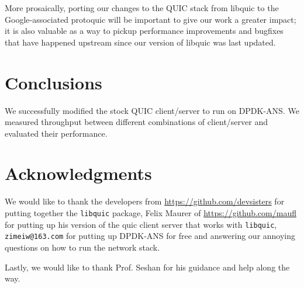 \documentclass{sig-alternate-05-2015}
\begin{document}
More prosaically, porting our changes to the QUIC stack from libquic
to the Google-associated protoquic
will be important to give our work a greater impact;
it is also valuable as a way to pickup performance improvements and bugfixes that have happened upstream
since our version of libquic was last updated.

\section{Conclusions}
We successfully modified the stock QUIC client/server to run on DPDK-ANS. We measured throughput between different combinations of client/server and evaluated their performance.

\section{Acknowledgments}
We would like to thank the developers from \url{https://github.com/devsisters} for putting together the \texttt{libquic} package, Felix Maurer of \url{https://github.com/maufl} for putting up his version of the quic client server that works with \texttt{libquic}, \texttt{zimeiw@163.com} for putting up DPDK-ANS for free and answering our annoying questions on how to run the network stack.

Lastly, we would like to thank Prof. Seshan for his guidance and help along the way.




\end{document}
